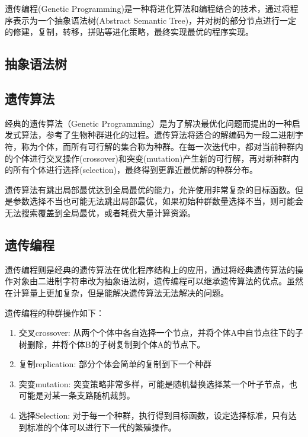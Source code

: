 遗传编程(Genetic Programming)是一种将进化算法和编程结合的技术，通过将程序表示为一个抽象语法树(Abstract Semantic Tree)，并对树的部分节点进行一定的修建，复制，转移，拼贴等进化策略，最终实现最优的程序实现。

\subsection{抽象语法树}


\subsection{遗传算法}

经典的遗传算法（Genetic Programming）是为了解决最优化问题而提出的一种启发式算法，参考了生物种群进化的过程。遗传算法将适合的解编码为一段二进制字符，称为个体，而所有可行解的集合称为种群。在每一次迭代中，都对当前种群内的个体进行交叉操作(crossover)和突变(mutation)产生新的可行解，再对新种群内的所有个体进行选择(selection)，最终得到更靠近最优解的种群分布。

遗传算法有跳出局部最优达到全局最优的能力，允许使用非常复杂的目标函数。但是参数选择不当也可能无法跳出局部最优，如果初始种群数量选择不当，则可能会无法搜索覆盖到全局最优，或者耗费大量计算资源。

\subsection{遗传编程}

遗传编程则是经典的遗传算法在优化程序结构上的应用，通过将经典遗传算法的操作对象由二进制字符串改为抽象语法树，遗传编程可以继承遗传算法的优点。虽然在计算量上更加复杂，但是能解决遗传算法无法解决的问题。

遗传编程的种群操作如下：

\begin{enumerate}
    \item 交叉crossover: 从两个个体中各自选择一个节点，并将个体A中自节点往下的子树删除，并将个体B的子树复制到个体A的节点下。
    \item 复制replication: 部分个体会简单的复制到下一个种群
    \item 突变mutation: 突变策略非常多样，可能是随机替换选择某一个叶子节点，也可能是对某一条支路随机裁剪。
    \item 选择Selection: 对于每一个种群，执行得到目标函数，设定选择标准，只有达到标准的个体可以进行下一代的繁殖操作。
\end{enumerate}

